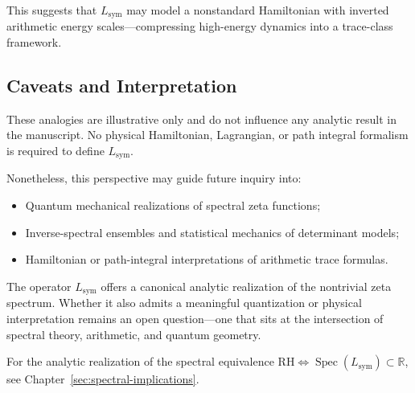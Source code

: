 This suggests that \( L_{\mathrm{sym}} \) may model a nonstandard Hamiltonian with inverted arithmetic energy scales—compressing high-energy dynamics into a trace-class framework.

\subsection*{Caveats and Interpretation}

These analogies are illustrative only and do not influence any analytic result in the manuscript. No physical Hamiltonian, Lagrangian, or path integral formalism is required to define \( L_{\mathrm{sym}} \).

Nonetheless, this perspective may guide future inquiry into:
\begin{itemize}
  \item Quantum mechanical realizations of spectral zeta functions;
  \item Inverse-spectral ensembles and statistical mechanics of determinant models;
  \item Hamiltonian or path-integral interpretations of arithmetic trace formulas.
\end{itemize}

\medskip
\noindent
The operator \( L_{\mathrm{sym}} \) offers a canonical analytic realization of the nontrivial zeta spectrum. Whether it also admits a meaningful quantization or physical interpretation remains an open question—one that sits at the intersection of spectral theory, arithmetic, and quantum geometry.

\medskip
\noindent
For the analytic realization of the spectral equivalence \( \mathrm{RH} \iff \operatorname{Spec}(L_{\mathrm{sym}}) \subset \mathbb{R} \), see Chapter~\ref{sec:spectral-implications}.
